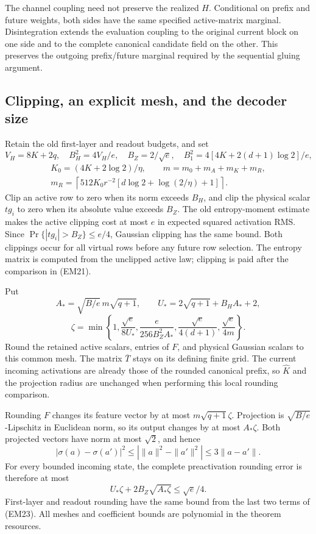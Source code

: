 The channel coupling need not preserve the realized $H$. Conditional
on prefix and future weights, both sides have the same specified
active-matrix marginal. Disintegration extends the evaluation coupling
to the original current block on one side and to the complete canonical
candidate field on the other. This preserves the outgoing
prefix/future marginal required by the sequential gluing argument.

\subsection{Clipping, an explicit mesh, and the decoder size}

Retain the old first-layer and readout budgets, and set
\[
 V_H=8K+2q,\quad B_H^2=4V_H/e,\quad B_Z=2/\sqrt e,
 \quad B_1^2=4[4K+2(d+1)\log2]/e,
\]
\[
 \begin{gathered}
 K_0=(4K+2\log2)/\eta,\qquad m=m_0+m_A+m_K+m_R,\\
 m_R=\left\lceil512K_0r^{-2}
       [d\log2+\log(2/\eta)+1]\right\rceil.
 \end{gathered}
 \tag{EM22}
\]
Clip an active row to zero when its norm exceeds $B_H$, and clip the
physical scalar $tg_i$ to zero when its absolute value exceeds $B_Z$.
The old entropy-moment estimate makes the active clipping cost at most
$e$ in expected squared activation RMS. Since
$\Pr\{|tg_i|>B_Z\}\le e/4$, Gaussian clipping has the same bound.
Both clippings occur for all virtual rows before any future row selection.
The entropy matrix is computed from the unclipped active law; clipping
is paid after the comparison in (EM21).

Put
\[
 A_* =\sqrt{B/e}\,m\sqrt{q+1},\qquad
 U_*=2\sqrt{q+1}+B_HA_*+2,
\]
\[
 \zeta=\min\left\{1,\frac{\sqrt e}{8U_*},
       \frac{e}{256B_Z^2 A_*},
       \frac{\sqrt e}{4(d+1)},\frac{\sqrt e}{4m}\right\}.
 \tag{EM23}
\]
Round the retained active scalars, entries of $F$, and physical Gaussian
scalars to this common mesh. The matrix $\overline T$ stays on its
defining finite grid. The current incoming activations are already those
of the rounded canonical prefix, so $\widehat K$ and the projection
radius are unchanged when performing this local rounding comparison.

Rounding $F$ changes its feature vector by at most
$m\sqrt{q+1}\zeta$. Projection is $\sqrt{B/e}$-Lipschitz in Euclidean
norm, so its output changes by at most $A_*\zeta$. Both projected
vectors have norm at most $\sqrt2$, and hence
\[
 |\sigma(a)-\sigma(a')|^2
 \le|\|a\|^2-\|a'\|^2|\le3\|a-a'\|.
\]
For every bounded incoming state, the complete preactivation rounding
error is therefore at most
\[
 U_*\zeta+2B_Z\sqrt{A_*\zeta}\le\sqrt e/4.
 \tag{EM24}
\]
First-layer and readout rounding have the same bound from the last two
terms of (EM23). All meshes and coefficient bounds are polynomial in
the theorem resources.

